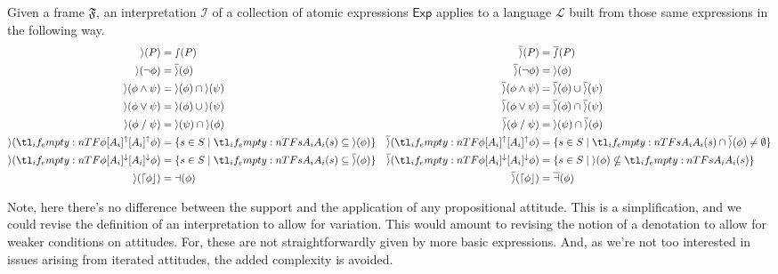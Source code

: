 \documentclass[10pt]{article}
\newcommand{\intp}{\ensuremath{\mathcal{i}}}
\newcommand{\Intp}{\ensuremath{\mathcal{I}}}
\newcommand{\supp}{\ensuremath{\mathcal{s}}}
\newcommand{\appl}{\ensuremath{\mathcal{a}}}
\newcommand{\csupp}[1]{\ensuremath{\supp(#1)}}
\newcommand{\isupp}[1]{\ensuremath{\overline{\supp}(#1)}}
\newcommand{\cappl}[1]{\ensuremath{\appl(#1)}}
\newcommand{\iappl}[1]{\ensuremath{\overline{\appl}(#1)}}
\newcommand{\cintp}[1]{\ensuremath{\intp(#1)}}
\newcommand{\iintp}[1]{\ensuremath{\overline{\intp}(#1)}}
\newcommand{\lattn}{\ensuremath{\lceil}}
\newcommand{\rattn}{\ensuremath{\rfloor}}
\newcommand{\attn}[1]{\ensuremath{\mathord{\lattn{#1}\rattn}}}
\def\ltrans{\mathrel{%
    /%
  }}
\begin{document}
\begin{definition}
  Given a frame \(\mathfrak{F}\), an interpretation \(\Intp\) of a collection of atomic expressions \(\mathsf{Exp}\) applies to a language \(\mathcal{L}\) built from those same expressions in the following way.
  \begin{align*}
    \cintp{P} &= \csupp{P} & \iintp{P} &= \isupp{P}\\
    \cintp{\lnot\phi} &= \iintp{\phi} & \iintp{\lnot\phi} &= \cintp{\phi}\\
    \cintp{\phi \land \psi} &= \cintp{\phi} \cap \cintp{\psi} & \iintp{\phi \land \psi} &= \iintp{\phi} \cup \iintp{\psi}\\
    \cintp{\phi \lor \psi} &= \cintp{\phi} \cup \cintp{\psi} & \iintp{\phi \lor \psi} &= \iintp{\phi} \cap \iintp{\psi}\\
    \cintp{\phi \ltrans \psi} &= \cintp{\psi} \cap \cintp{\phi} &  \iintp{\phi \ltrans \psi} &= \cintp{\psi} \cap \iintp{\phi}\\
    \cintp{\lattu{\phi}} &= \{s \in S \mid \fatt{s} \subseteq \cintp{\phi}\} & \iintp{\lattu{\phi}} &= \{s \in S \mid \fatt{s} \cap \iintp{\phi} \ne \emptyset\}\\
    \cintp{\lattd{\phi}} &= \{s \in S \mid  \fatt{s} \subseteq \iintp{\phi}\} & \iintp{\lattd{\phi}} &= \{s \in S \mid \cintp{\phi} \nsubseteq \fatt{s}\}\\
    \cintp{\attn{\phi}} &= \cappl{\phi} & \iintp{\attn{\phi}} &= \iappl{\phi}\\
  \end{align*}
\end{definition}

Note, here there's no difference between the support and the application of any propositional attitude.
This is a simplification, and we could revise the definition of an interpretation to allow for variation.
This would amount to revising the notion of a denotation to allow for weaker conditions on attitudes.
For, these are not straightforwardly given by more basic expressions.
And, as we're not too interested in issues arising from iterated attitudes, the added complexity is avoided.
\end{document}
